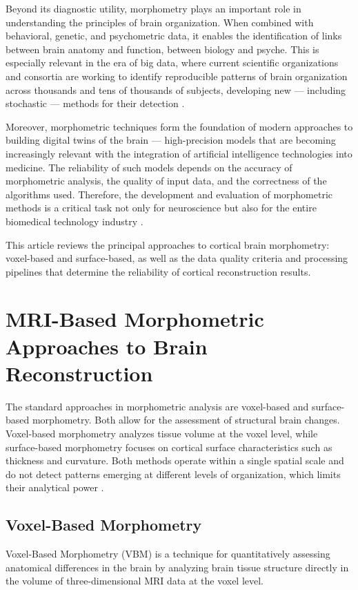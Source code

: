 \documentclass[default]{subfiles}
\begin{document}
Beyond its diagnostic utility, morphometry plays an important role in understanding the principles of brain
organization. When combined with behavioral, genetic, and psychometric data, it enables the identification of links
between brain anatomy and function, between biology and psyche. This is especially relevant in the era of big data,
where current scientific organizations and consortia are working to identify reproducible patterns of brain
organization across thousands and tens of thousands of subjects, developing new — including stochastic — methods for
their detection \cite{daoudi_2024, kurella_2023, cruz_2021, mosch_2023}.

Moreover, morphometric techniques form the foundation of modern approaches to building digital twins of the brain —
high-precision models that are becoming increasingly relevant with the integration of artificial intelligence
technologies into medicine. The reliability of such models depends on the accuracy of morphometric analysis, the
quality of input data, and the correctness of the algorithms used. Therefore, the development and evaluation of
morphometric methods is a critical task not only for neuroscience but also for the entire biomedical technology
industry \cite{marteua_2024, xiong_2023}.

This article reviews the principal approaches to cortical brain morphometry: voxel-based and surface-based, as well as
the data quality criteria and processing pipelines that determine the reliability of cortical reconstruction results.

\section{MRI-Based Morphometric Approaches to Brain Reconstruction}

The standard approaches in morphometric analysis are voxel-based and surface-based morphometry. Both allow for the
assessment of structural brain changes. Voxel-based morphometry analyzes tissue volume at the voxel level, while
surface-based morphometry focuses on cortical surface characteristics such as thickness and curvature. Both methods
operate within a single spatial scale and do not detect patterns emerging at different levels of organization, which
limits their analytical power \cite{cao_2023}.

\subsection{Voxel-Based Morphometry}
Voxel-Based Morphometry (VBM) is a technique for quantitatively assessing anatomical differences in the brain by
analyzing brain tissue structure directly in the volume of three-dimensional MRI data at the voxel level.
\end{document}

